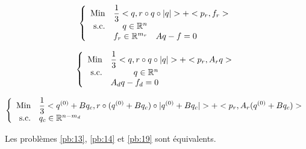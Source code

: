 \documentclass{article}
\begin{document}
    \begin{equation}
        \left\{
        \begin{array}{rrclll}
        \displaystyle \text{Min} & \multicolumn{4}{l}{\displaystyle \frac{1}{3}<q, r\circ q \circ |q|> + <p_r, f_r>}\\
        \textrm{s.c.}
            & q\in \mathbb{R}^n \\ 
            & f_r \in \mathbb{R}^{m_r}             
            & Aq - f = 0\\
                                    
        \end{array}
        \right.
        \label{pb:13}
    \end{equation}

    \begin{equation}
        \left\{
        \begin{array}{rrclll}
        \displaystyle \text{Min} & \multicolumn{4}{l}{\displaystyle \frac{1}{3}<q, r\circ q \circ |q|> + <p_r, A_rq>}\\
        \textrm{s.c.}         
            & q\in \mathbb{R}^n \\           
            & A_dq - f_d = 0\\
                                    
        \end{array}
        \right.
        \label{pb:14}
    \end{equation}

    \begin{equation}
        \left\{
        \begin{array}{rrclll}
        \displaystyle \text{Min} & \multicolumn{4}{l}{\displaystyle \frac{1}{3}<q^{(0)} + Bq_c, r\circ (q^{(0)} + Bq_c) \circ |q^{(0)} + Bq_c|> + <p_r, A_r(q^{(0)} + Bq_c)>}\\
        \textrm{s.c.}
            & q_c\in \mathbb{R}^{n - m_d} \\ 
                                    
        \end{array}
        \right.
        \label{pb:19}
    \end{equation}
    \begin{theorem}
        Les problèmes \ref{pb:13}, \ref{pb:14} et \ref{pb:19} sont équivalents.    
    \end{theorem}
\end{document}
